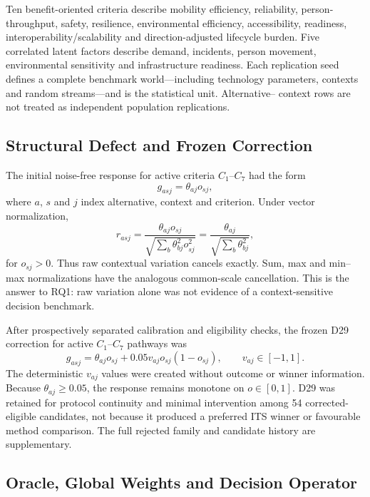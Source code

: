 \documentclass[runningheads]{llncs}
\begin{document}
Ten benefit-oriented criteria describe mobility efficiency, reliability, person-throughput,
safety, resilience, environmental efficiency, accessibility, readiness,
interoperability/scalability and direction-adjusted lifecycle burden. Five correlated latent
factors describe demand, incidents, person movement, environmental sensitivity and
infrastructure readiness. Each replication seed defines a complete benchmark world---including
technology parameters, contexts and random streams---and is the statistical unit. Alternative--
context rows are not treated as independent population replications.

\subsection{Structural Defect and Frozen Correction}
\label{sec:generator}

The initial noise-free response for active criteria $C_1$--$C_7$ had the form
\begin{equation}
g_{asj}=\theta_{aj}o_{sj},
\label{eq:separable}
\end{equation}
where $a$, $s$ and $j$ index alternative, context and criterion. Under vector normalization,
\begin{equation}
r_{asj}
=\frac{\theta_{aj}o_{sj}}{\sqrt{\sum_b\theta_{bj}^2o_{sj}^2}}
=\frac{\theta_{aj}}{\sqrt{\sum_b\theta_{bj}^2}},
\label{eq:collapse}
\end{equation}
for $o_{sj}>0$. Thus raw contextual variation cancels exactly. Sum, max and min--max
normalizations have the analogous common-scale cancellation. This is the answer to RQ1: raw
variation alone was not evidence of a context-sensitive decision benchmark.

After prospectively separated calibration and eligibility checks, the frozen D29 correction for
active $C_1$--$C_7$ pathways was
\begin{equation}
g_{asj}=\theta_{aj}o_{sj}+0.05v_{aj}o_{sj}(1-o_{sj}),
\qquad v_{aj}\in[-1,1].
\label{eq:d29}
\end{equation}
The deterministic $v_{aj}$ values were created without outcome or winner information. Because
$\theta_{aj}\geq0.05$, the response remains monotone on $o\in[0,1]$. D29 was retained for
protocol continuity and minimal intervention among 54 corrected-eligible candidates, not
because it produced a preferred ITS winner or favourable method comparison. The full rejected
family and candidate history are supplementary.

\subsection{Oracle, Global Weights and Decision Operator}
\end{document}
